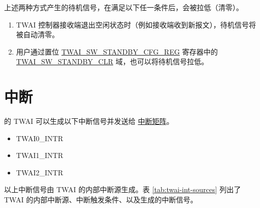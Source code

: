 \documentclass[main\_\_CN.tex]{subfiles}
\begin{document}
上述两种方式产生的待机信号，在满足以下任一条件后，会被拉低（清零）。
\begin{enumerate}
    \item TWAI 控制器接收端退出空闲状态时（例如接收端收到新报文），待机信号将被自动清零。
    \item 用户通过置位 \hyperref[regdesc:TWAISWSTANDBYCFGREG]{TWAI\_SW\_STANDBY\_CFG\_REG} 寄存器中的 \hyperref[fielddesc:TWAISWSTANDBYCLR]{TWAI\_SW\_STANDBY\_CLR} 域，也可以将待机信号拉低。
\end{enumerate}



\section{中断}
\label{sec:twai-interrupt-management}


\chipname{} 的 TWAI 可以生成以下中断信号并发送给 \hyperref[mod:intmtrx]{中断矩阵}。

    \begin{itemize}
        \item TWAI0\_INTR
        \item TWAI1\_INTR
        \item TWAI2\_INTR
    \end{itemize}

以上中断信号由 TWAI 的内部中断源生成。表 \ref{tab:twai-int-sources} 列出了 TWAI 的内部中断源、中断触发条件、以及生成的中断信号。
\end{document}
